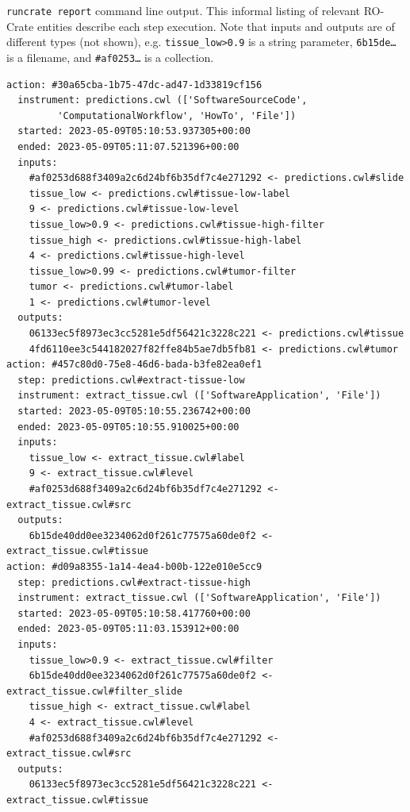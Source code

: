 \begin{listing}
  \caption[runcrate report command line output]{\texttt{runcrate report} command line output. This informal listing of relevant RO-Crate entities describe each step execution. Note that inputs and outputs are of different types (not shown), e.g. \texttt{tissue\_low>0.9} is a string parameter, \texttt{6b15de…} is a filename, and \texttt{\#af0253…} is a collection.}
  \label{ch54:lst:ml_pipeline_streamflow_report}
\begin{footnotesize}
\begin{verbatim}
action: #30a65cba-1b75-47dc-ad47-1d33819cf156
  instrument: predictions.cwl (['SoftwareSourceCode', 
         'ComputationalWorkflow', 'HowTo', 'File'])
  started: 2023-05-09T05:10:53.937305+00:00
  ended: 2023-05-09T05:11:07.521396+00:00
  inputs:
    #af0253d688f3409a2c6d24bf6b35df7c4e271292 <- predictions.cwl#slide
    tissue_low <- predictions.cwl#tissue-low-label
    9 <- predictions.cwl#tissue-low-level
    tissue_low>0.9 <- predictions.cwl#tissue-high-filter
    tissue_high <- predictions.cwl#tissue-high-label
    4 <- predictions.cwl#tissue-high-level
    tissue_low>0.99 <- predictions.cwl#tumor-filter
    tumor <- predictions.cwl#tumor-label
    1 <- predictions.cwl#tumor-level
  outputs:
    06133ec5f8973ec3cc5281e5df56421c3228c221 <- predictions.cwl#tissue
    4fd6110ee3c544182027f82ffe84b5ae7db5fb81 <- predictions.cwl#tumor
action: #457c80d0-75e8-46d6-bada-b3fe82ea0ef1
  step: predictions.cwl#extract-tissue-low
  instrument: extract_tissue.cwl (['SoftwareApplication', 'File'])
  started: 2023-05-09T05:10:55.236742+00:00
  ended: 2023-05-09T05:10:55.910025+00:00
  inputs:
    tissue_low <- extract_tissue.cwl#label
    9 <- extract_tissue.cwl#level
    #af0253d688f3409a2c6d24bf6b35df7c4e271292 <- extract_tissue.cwl#src
  outputs:
    6b15de40dd0ee3234062d0f261c77575a60de0f2 <- extract_tissue.cwl#tissue
action: #d09a8355-1a14-4ea4-b00b-122e010e5cc9
  step: predictions.cwl#extract-tissue-high
  instrument: extract_tissue.cwl (['SoftwareApplication', 'File'])
  started: 2023-05-09T05:10:58.417760+00:00
  ended: 2023-05-09T05:11:03.153912+00:00
  inputs:
    tissue_low>0.9 <- extract_tissue.cwl#filter
    6b15de40dd0ee3234062d0f261c77575a60de0f2 <- extract_tissue.cwl#filter_slide
    tissue_high <- extract_tissue.cwl#label
    4 <- extract_tissue.cwl#level
    #af0253d688f3409a2c6d24bf6b35df7c4e271292 <- extract_tissue.cwl#src
  outputs:
    06133ec5f8973ec3cc5281e5df56421c3228c221 <- extract_tissue.cwl#tissue

\end{verbatim}
\end{footnotesize}
\end{listing}
